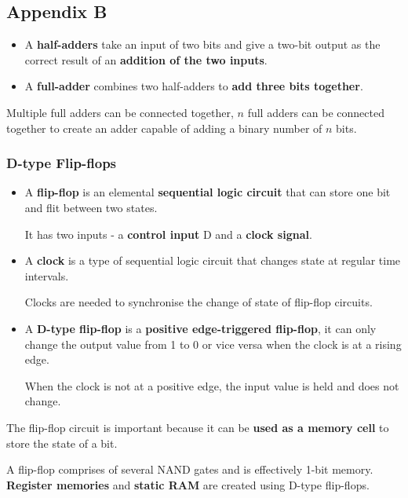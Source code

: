 \subsection*{Appendix B}

\begin{itemize}
    \item A \textbf{half-adders} take an input of two bits and give a two-bit output as the correct result of an \textbf{addition of the two inputs}.
    \item A \textbf{full-adder} combines two half-adders to \textbf{add three bits together}.
\end{itemize}

Multiple full adders can be connected together, $n$ full adders can be connected together to create an adder capable of adding a binary number of $n$ bits.

\subsubsection*{D-type Flip-flops}
\begin{itemize}
    \item A \textbf{flip-flop} is an elemental \textbf{sequential logic circuit} that can store one bit and flit between two states.

        It has two inputs - a \textbf{control input} D and a \textbf{clock signal}.

    \item A \textbf{clock} is a type of sequential logic circuit that changes state at regular time intervals.

        Clocks are needed to synchronise the change of state of flip-flop circuits.
    \item A \textbf{D-type flip-flop} is a \textbf{positive edge-triggered flip-flop}, it can only change the output value from 1 to 0 or vice versa when the clock is at a rising edge.

        When the clock is not at a positive edge, the input value is held and does not change.
\end{itemize}

The flip-flop circuit is important because it can be \textbf{used as a memory cell} to store the state of a bit.

A flip-flop comprises of several NAND gates and is effectively 1-bit memory. \textbf{Register memories} and \textbf{static RAM} are created using D-type flip-flops.
